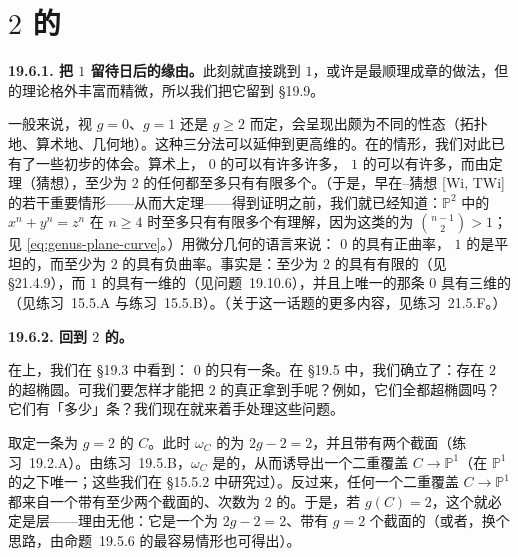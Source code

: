 
\section{\trGenus{} $2$ 的\trCurve}

\textbf{19.6.1. 把\trGenus{} $1$ 留待日后的缘由。}\quad 此刻就直接跳到\trGenus{} $1$，或许是最顺理成章的做法，但\trEllipticCurve{}的理论格外丰富而精微，所以我们把它留到 \S19.9。

一般来说，视 $g=0$、$g=1$ 还是 $g\ge 2$ 而定，\trCurve{}会呈现出颇为不同的性态（拓扑地、算术地、几何地）。这种三分法可以延伸到更高维的\trVariety。在\trCurve{}的情形，我们对此已有了一些初步的体会。算术上，\trGenus{} $0$ 的\trCurve{}可以有许多许多\trRationalPoint，\trGenus{} $1$ 的\trCurve{}可以有许多\trRationalPoint，而由\trFaltings{}定理（\trMordell{}猜想），\trGenus{}至少为 $2$ 的任何\trCurve{}都至多只有有限多个\trRationalPoint。（于是，早在\trTaniyama--\trShimura{}猜想 [Wi, TWi] 的若干重要情形——从而\trFermat{}大定理——得到证明之前，我们就已经知道：$\mathbb{P}^2$ 中的 $x^n+y^n=z^n$ 在 $n\ge 4$ 时至多只有有限多个有理解，因为这类\trCurve{}的\trGenus{}为 $\binom{n-1}{2}>1$；见 \eqref{eq:genus-plane-curve}。）用微分几何的语言来说：\trGenus{} $0$ 的\trRiemannSurface{}具有正曲率，\trGenus{} $1$ 的\trRiemannSurface{}是平坦的，而\trGenus{}至少为 $2$ 的\trRiemannSurface{}具有负曲率。事实是：\trGenus{}至少为 $2$ 的\trCurve{}具有有限的\trAutomorphismGroup（见 \S21.4.9），而\trGenus{} $1$ 的\trCurve{}具有一维的\trAutomorphismGroup（见\mbox{问题~19.10.6}），并且\trAlgClosedField{}上唯一的那条\trGenus{} $0$ \trCurve{}具有三维的\trAutomorphismGroup（见\mbox{练习~15.5.A} 与\mbox{练习~15.5.B}）。（关于这一话题的更多内容，见\mbox{练习~21.5.F}。）

\textbf{19.6.2. 回到\trGenus{} $2$ 的\trCurve。}

在\trAlgClosedField{}上，我们在 \S19.3 中看到：\trGenus{} $0$ 的\trCurve{}只有一条。在 \S19.5 中，我们确立了：存在\trGenus{} $2$ 的超椭圆\trCurve。可我们要怎样才能把\trGenus{} $2$ 的\trCurve{}真正拿到手呢？例如，它们全都超椭圆吗？它们有「多少」条？我们现在就来着手处理这些问题。

取定一条\trGenus{}为 $g=2$ 的\trCurve{} $C$。此时 $\omega_C$ 的\trDegree{}为 $2g-2=2$，并且带有两个截面（\mbox{练习~19.2.A}）。由\mbox{练习~19.5.B}，$\omega_C$ 是\trBasePointFree{}的，从而诱导出一个二重覆盖 $C\to\mathbb{P}^1$（在 $\mathbb{P}^1$ 的\trAutomorphism{}之下唯一；这些\trAutomorphism{}我们在 \S15.5.2 中研究过）。反过来，任何一个二重覆盖 $C\to\mathbb{P}^1$ 都来自一个带有至少两个截面的、次数为 $2$ 的\trInvertibleSheaf。于是，若 $g(C)=2$，这个\trInvertibleSheaf{}就必定是\trCanonical{}层——理由无他：它是一个\trDegree{}为 $2g-2=2$、带有 $g=2$ 个截面的\trLineBundle（或者，换个思路，由\mbox{命题~19.5.6} 的最容易情形也可得出）。

